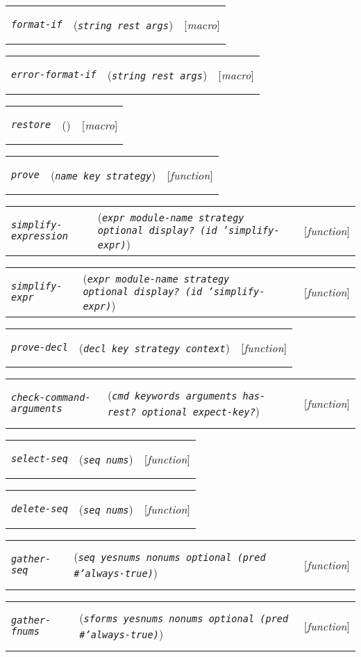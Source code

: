 \documentclass[12pt]{book}
\makeatletter
\def\ampoptional{{\smaller\sc {\smaller\smaller \&}optional\ }}
\def\amprest{{\smaller\sc {\smaller\smaller \&}rest\ }}
\def\ampkey{{\smaller\sc {\smaller\smaller \&}key\ }}
\newenvironment{function}[3]%
{\par\noindent\begin{boxedminipage}{\textwidth}%
 \par\noindent\begin{tabularx}{\linewidth}{l>{\raggedright}Xr}%
 \functionhtgt{#1}&(\texttt{\textit{#2}})&[\emph{#3}]%
 \end{tabularx}\par\flushright\begin{minipage}{.97\textwidth}}
{\end{minipage}\end{boxedminipage}}
\newcommand{\functionnm}[1]{\texttt{\textit{#1}}}
\newcommand{\functionhtgt}[1]{\hypertarget{#1}{\functionnm{#1}}\index{#1@\functionnm{#1}|underline}}
\newenvironment{lispfunction}[2]%
{\begin{function}{#1}{#2}{function}}{\end{function}}
\newenvironment{macro}[2]%
{\begin{function}{#1}{#2}{macro}}{\end{function}}
\makeatother
\begin{document}
\begin{macro}{format-if}{string \amprest args}
\end{macro}

\begin{macro}{error-format-if}{string \amprest args}
\end{macro}

\begin{macro}{restore}{}
\end{macro}

\begin{lispfunction}{prove}{name \ampkey strategy}
\end{lispfunction}

\begin{lispfunction}{simplify-expression}
  {expr module-name strategy \ampoptional display? \textup{(}id \textup{'simplify-expr}\textup{)}}
\end{lispfunction}

\begin{lispfunction}{simplify-expr}
  {expr module-name strategy \ampoptional display? \textup{(}id \textup{'simplify-expr}\textup{)}}
\end{lispfunction}

\begin{lispfunction}{prove-decl}{decl \ampkey strategy context}
\end{lispfunction}

\begin{lispfunction}{check-command-arguments}
  {cmd keywords arguments has-rest? \ampoptional expect-key?}
\end{lispfunction}

\begin{lispfunction}{select-seq}{seq nums}
\end{lispfunction}

\begin{lispfunction}{delete-seq}{seq nums}
\end{lispfunction}

\begin{lispfunction}{gather-seq}
  {seq yesnums nonums \ampoptional \textup{(}pred \textup{\#'always-true}\textup{)}}
\end{lispfunction}

\begin{lispfunction}{gather-fnums}
  {sforms yesnums nonums \ampoptional \textup{(}pred \textup{\#'always-true}\textup{)}}
\end{lispfunction}
\end{document}
